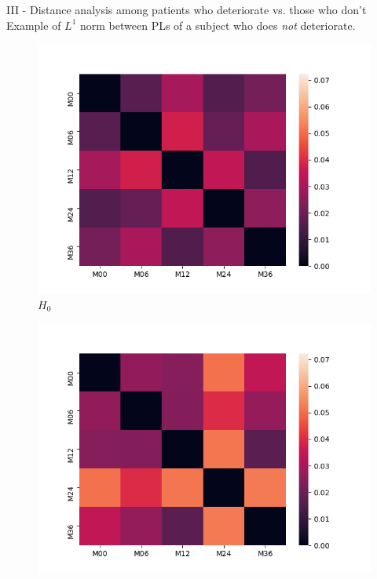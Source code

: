 \documentclass[aspectratio=169, 10pt, dvipsnames]{beamer}
\begin{document}
\begin{frame}[fragile]{III - Distance analysis among patients who deteriorate vs. those who don't}
  Example of $L^1$ norm between PLs of a subject who does \emph{not} deteriorate.\\
  \begin{figure}
    \centering
    \includegraphics[width=\textwidth]{figures/temporal_evolution/ADNI011S0023_h_0.png}
    \caption{$H_0$}
  \end{figure}
  \endminipage
  \hfill
  \begin{figure}
    \centering
    \includegraphics[width=\textwidth]{figures/temporal_evolution/ADNI011S0023_h_1.png}

\end{figure}
\end{frame}
\end{document}
